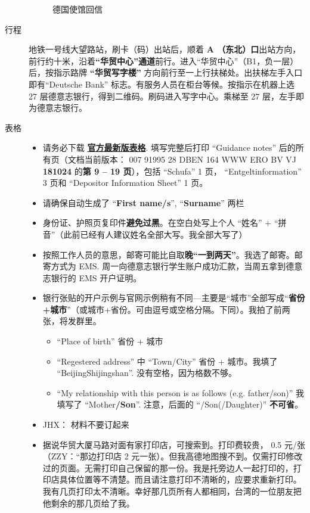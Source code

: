 \documentclass[oneside,final]{book}
\begin{document}
\begin{appendices}
\begin{description}
\begin{figure}[htbp]
  \caption{德国使馆回信}
  \label{fig:email}
\end{figure}
\item[行程] 地铁一号线大望路站，刷卡（码）出站后，顺着 \textbf{\color{blue}A （东北）口}出站方向，前行约十米，沿着\textbf{\color{blue}“华贸中心”通道}前行。进入“华贸中心”（B1，负一层）后，按指示路牌 \textbf{\color{blue}“华贸写字楼”} 方向前行至一上行扶梯处。出扶梯左手入口即有``Deutsche Bank'' 标志。有服务人员在柜台等候。按指示在机器上选 27 层德意志银行，得到二维码。刷码进入写字中心。乘梯至 27 层，左手即为德意志银行。
\item[表格]
\begin{itemize}
  \item 请务必下载 \href{https://china.db.com/china/docs/1.opening\_a\_bank\_account\_for\_foreign\_students\_over18years.pdf}{\textbf{\color{blue}官方最新版表格}}. 填写完整后打印 ``Guidance notes'' 后的所有页（文档当前版本：
  007 91995 28 DBEN 164 WWW ERO BV VJ \textbf{\color{blue}181024} 的\textbf{\color{blue}第 9 -- 19 页}），包括 ``Schufa'' 1 页， ``Entgeltinformation'' 3 页和 ``Depositor Information Sheet'' 1 页。 
  \item 请确保自动生成了 ``\textbf{\color{blue}First name/s}'', ``\textbf{\color{blue}Surname}'' 两栏
  \item 身份证、护照页复印件\textbf{避免过黑}。在空白处写上个人 “姓名” + “拼音”（此前已经有人建议姓名全部大写。我全部大写了）
  \item 按照工作人员的意思，邮寄可能比自取\textbf{\color{blue}晚“一到两天”}。我选了邮寄。邮寄方式为 EMS. 周一向德意志银行学生账户成功汇款，当周五拿到德意志银行的 EMS 开户证明。
  \item 银行张贴的开户示例与官网示例稍有不同---主要是“城市”全部写成“\textbf{\color{blue}省份+城市}”（或城市+省份。可由逗号或空格分隔。下同）。我拍了前两张，将发群里。
  \begin{itemize}
    \item ``Place of birth'' 省份 + 城市
    \item ``Regestered address'' 中 ``Town/City'' 省份 + 城市。我填了 ``BeijingShijingshan''. 没有空格，因为格数不够。
    \item ``My relationship with this person is as follows (e.g. father/son)'' 我填写了 ``Mother\textbf{\color{blue}/Son}''. 注意，后面的 ``/Son(/Daughter)'' \textbf{\color{blue}不可省}。
  \end{itemize}
\item JHX： 材料不要订起来
\item 据说华贸大厦马路对面有家打印店，可搜索到。打印费较贵， 0.5 元/张（ZZY：“那边打印店 2 元一张）。但我高德地图搜不到。仅需打印修改过的页面。{\color{blue}无需打印自己保留的那一份}。我是托旁边人一起打印的，打印店具体位置等不清楚。而且请注意{\color{blue}打印不清晰的，应要求重新打印}。我有几页打印太不清晰。幸好那几页所有人都相同，台湾的一位朋友把他剩余的那几页给了我。

\end{itemize}
\end{description}
\end{appendices}
\end{document}
